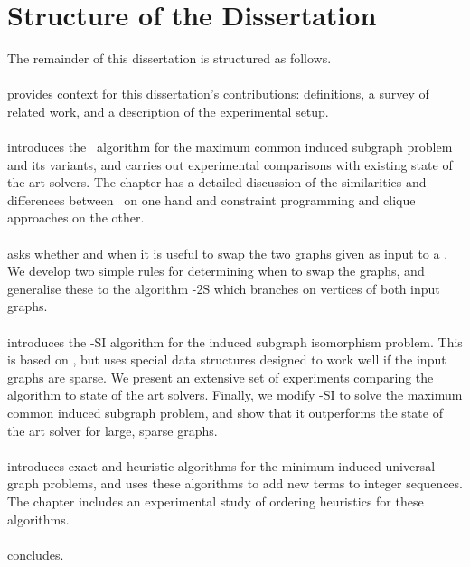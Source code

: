 \section{Structure of the Dissertation}

The remainder of this dissertation is structured as follows.

\paragraph*{} provides context for this dissertation's
contributions: definitions, a survey of related work, and a description of the
experimental setup.

\paragraph*{} introduces the \McSplit\
algorithm for the maximum common induced subgraph problem and its variants, and
carries out experimental comparisons with existing state of the art solvers.
The chapter has a detailed discussion of the similarities and differences
between \McSplit\ on one hand and constraint programming and clique approaches
on the other.


\paragraph*{} asks whether and when
it is useful to swap the two graphs given as input to a \McSplit.  We develop
two simple rules for determining when to swap the graphs, and generalise
these to the algorithm \McSplit-2S which branches on vertices of both
input graphs.

\paragraph*{} introduces the \McSplit-SI algorithm for the
induced subgraph isomorphism problem.  This is based on \McSplit, but uses
special data structures designed to work well if the input graphs are sparse.
We present an extensive set of experiments comparing the algorithm to state of
the art solvers.  Finally, we modify \McSplit-SI to solve the maximum common
induced subgraph problem, and show that it outperforms the state of the art
solver for large, sparse graphs.

\paragraph*{} introduces exact and heuristic
algorithms for the minimum induced universal graph problems, and uses these
algorithms to add new terms to integer sequences.  The chapter includes
an experimental study of ordering heuristics for these algorithms.

\paragraph*{} concludes.


